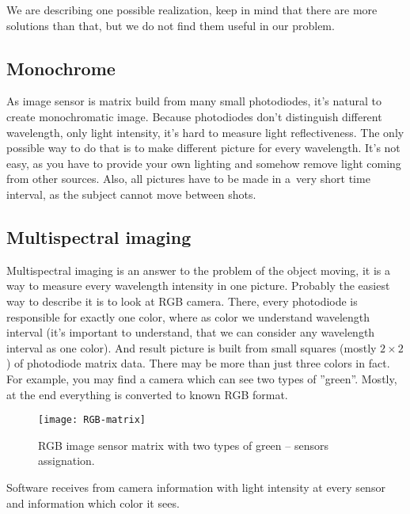        We are describing one possible realization, keep in mind that
        there are more solutions than that, but we do not find them
        useful in our problem.

        \subsection*{Monochrome}
            As image sensor is matrix build from many small photodiodes,
            it's natural to create monochromatic image.
            Because photodiodes don't distinguish different
            wavelength, only light intensity, it's hard
            to measure light reflectiveness.
            The only possible way to do that is to
            make different picture for every wavelength.
            It's not easy, as you have to
            provide your own lighting and somehow remove
            light coming from other sources.
            Also, all pictures have to be made in
            a~very short time interval, as the subject
            cannot move between shots.

        \subsection*{Multispectral imaging}
            Multispectral imaging is an answer to the problem of the object moving,
            it is a way to measure every wavelength intensity in one picture.
            Probably the easiest way to describe it is to look at RGB camera.
            There, every photodiode is responsible for exactly one color,
            where as color we understand wavelength interval (it's important
            to understand, that we can consider any wavelength interval as one color).
            And result picture is built from small squares (mostly $2 \times 2$)
            of photodiode matrix data.
            There may be more than just three colors in fact.
            For example, you may find a camera which can see two types of ''green''.
            Mostly, at the end everything is converted to known RGB format.

            \begin{figure}[H]
                \caption{RGB image sensor matrix with two types of green -- sensors assignation.}
                \centering
                \texttt{[image: RGB-matrix]}
                \label{fig:RGB-matrix}
            \end{figure}

            Software receives from camera information with light intensity at every
            sensor and information which color it sees.

